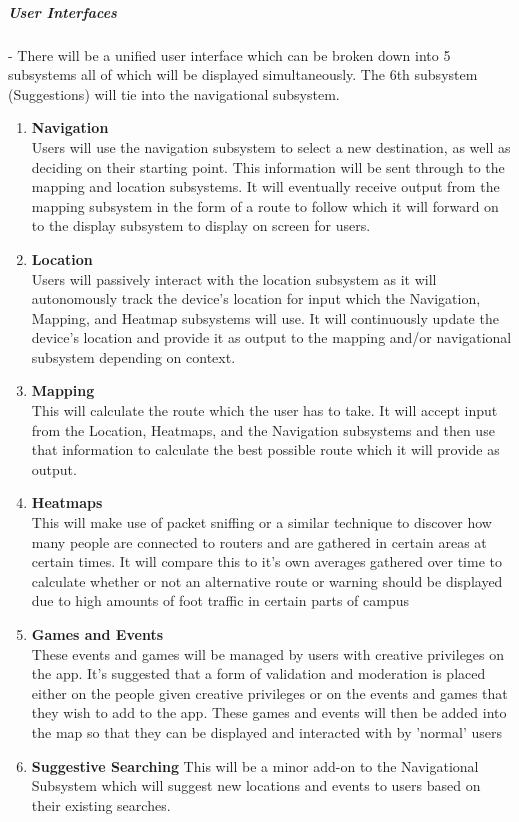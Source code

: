 \documentclass[english]{article}
\begin{document}
					    \subparagraph{User Interfaces}
					     - There will be a unified user interface which can be broken down into 5 subsystems all of which will be displayed simultaneously. The 6th subsystem (Suggestions) will tie into the navigational subsystem.
					    \begin{enumerate}
					        \item \textbf{Navigation}\\
					        Users will use the navigation subsystem to select a new destination, as well as deciding on their starting point. This information will be sent through to the mapping and location subsystems. It will eventually receive output from the mapping subsystem in the form of a route to follow which it will forward on to the display subsystem to display on screen for users.
					        \item \textbf{Location}\\
					        Users will passively interact with the location subsystem as it will autonomously track the device's location for input which the Navigation, Mapping, and Heatmap subsystems will use. It will continuously update the device's location and provide it as output to the mapping and/or navigational subsystem depending on context.
					        \item \textbf{Mapping}\\
					        This will calculate the route which the user has to take. It will accept input from the Location, Heatmaps, and the Navigation subsystems and then use that information to calculate the best possible route which it will provide as output.
					        \item \textbf{Heatmaps}\\
					        This will make use of packet sniffing or a similar technique to discover how many people are connected to routers and are gathered in certain areas at certain times. It will compare this to it's own averages gathered over time to calculate whether or not an alternative route or warning should be displayed due to high amounts of foot traffic in certain parts of campus
					        \item \textbf{Games and Events}\\
					        These events and games will be managed by users with creative privileges on the app. It's suggested that a form of validation and moderation is placed either on the people given creative privileges or on the events and games that they wish to add to the app. These games and events will then be added into the map so that they can be displayed and interacted with by 'normal' users
					        \item \textbf{Suggestive Searching}
					        This will be a minor add-on to the Navigational Subsystem which will suggest new locations and events to users based on their existing searches.	        
					        
					    \end{enumerate}
\end{document}
